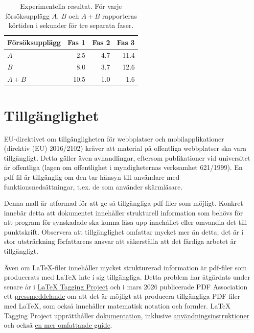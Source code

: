 \documentclass[swedish, manual, a4paper]{csthesis}
\begin{document}
\begin{table}[b] %
\centering
\caption{Experimentella resultat. För varje försöksupplägg $A$, $B$ och $A+B$ rapporteras körtiden i sekunder för tre separata faser. \label{table:results-sv}}
\begin{tabular}{l r r r} \toprule
Försöksupplägg & Fas 1 & Fas 2 & Fas 3 \\ 
\midrule 
$A$ & 2.5 & 4.7 & 11.4 \\
$B$ & 8.0 & 3.7 & 12.6 \\
$A+B$ & 10.5 & 1.0 & 1.6 \\\bottomrule
%
\end{tabular}
\end{table}

\section{Tillgänglighet}
\label{sec:tillganglighet}


EU-direktivet om tillgängligheten för webbplatser och mobilapplikationer (direktiv (EU) 2016/2102) kräver att material på offentliga webbplatser ska vara tillgängligt. Detta gäller även avhandlingar, eftersom publikationer vid universitet är offentliga (lagen om offentlighet i myndigheternas verksamhet 621/1999). En pdf-fil är tillgänglig om den tar hänsyn till användare med funktionsnedsättningar, t.ex. de som använder skärmläsare.

Denna mall är utformad för att ge så tillgängliga pdf-filer som möjligt. Konkret innebär detta att dokumentet innehåller strukturell information som behövs för att program för synskadade ska kunna läsa upp innehållet eller omvandla det till punktskrift. Observera att tillgänglighet omfattar mycket mer än detta; det är i stor utsträckning författarens ansvar att säkerställa att det färdiga arbetet är tillgängligt.

Även om \LaTeX{}-filer innehåller mycket strukturerad information är pdf-filer som producerats med \LaTeX{} inte i sig tillgängliga. Detta problem har åtgärdats under senare år i \href{https://latex3.github.io/tagging-project}{\LaTeX{} Tagging Project} och i mars 2026 publicerade PDF Association ett \href{https://pdfa.org/accessible-math-in-pdf-finally}{pressmeddelande} om att det är möjligt att producera tillgängliga PDF-filer med LaTeX, som också innehåller matematisk notation och formler. \LaTeX{} Tagging Project upprätthåller \href{https://latex3.github.io/tagging-project/documentation/}{dokumentation}, inklusive \href{https://latex3.github.io/tagging-project/documentation/usage-instructions}{användningsinstruktioner} och också \href{https://latex3.github.io/tagging-project/documentation/wtpdf/fulldoc}{en mer omfattande guide}. 
\end{document}
